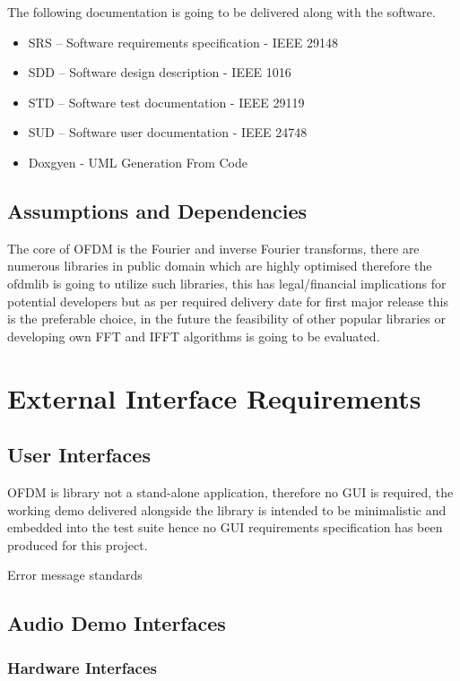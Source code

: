 \documentclass[]{report}
\begin{document}
The following documentation is going to be delivered along with the software.

\begin{itemize}
	\item SRS – Software requirements specification - IEEE 29148
	\item SDD – Software design description - IEEE 1016
	\item STD – Software test documentation - IEEE 29119
	\item SUD – Software user documentation - IEEE 24748
	\item Doxgyen - UML Generation From Code 
\end{itemize}


\subsection{Assumptions and Dependencies}

The core of OFDM is the Fourier and inverse Fourier transforms, there are numerous libraries in public domain which are highly optimised therefore the ofdmlib is going to utilize such libraries, this has legal/financial implications for potential developers but as per required delivery date for first major release this is the preferable choice, in the future the feasibility of other popular libraries or developing own FFT and IFFT algorithms is going to be evaluated.

\pagebreak
\section{External Interface Requirements}

\subsection{User Interfaces}

OFDM is library not a stand-alone application, therefore no GUI is required, the working demo delivered alongside the library is intended to be minimalistic and embedded into the test suite hence no GUI requirements specification has been produced for this project. 

Error message standards

\subsection{Audio Demo Interfaces}


\subsubsection{Hardware Interfaces}
\end{document}
